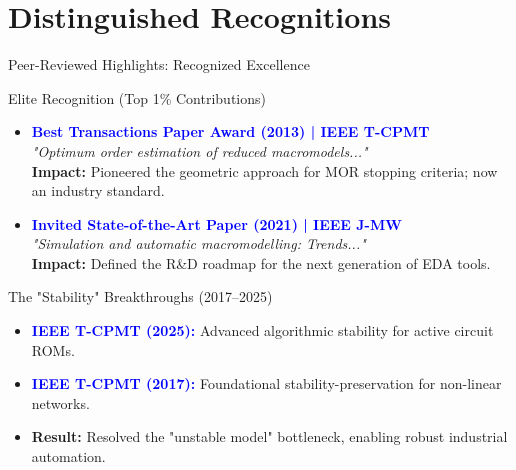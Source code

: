 \section{Distinguished Recognitions}

\begin{frame}[t]{Peer-Reviewed Highlights: Recognized Excellence}

	\begin{exampleblock}{\large Elite Recognition (Top 1\% Contributions)}
		\begin{itemize}
			\item \textbf{\textcolor{blue}{Best Transactions Paper Award (2013) | IEEE T-CPMT}} \\[4pt]
			      \textit{"Optimum order estimation of reduced macromodels..."} \\
			      \textbf{Impact:} Pioneered the geometric approach for MOR stopping criteria; now an industry standard.

			\item \textbf{\textcolor{blue}{\large Invited State-of-the-Art Paper (2021) | IEEE J-MW}} \\
			      \textit{"Simulation and automatic macromodelling: Trends..."} \\
			      \textbf{Impact:} Defined the R\&D roadmap for the next generation of EDA tools.
		\end{itemize}
	\end{exampleblock}

	\vspace{0.2cm}

	\begin{exampleblock}{\large The "Stability" Breakthroughs (2017--2025)}
		\begin{itemize}
			\item \textbf{\textcolor{blue}{IEEE T-CPMT (2025):}} Advanced algorithmic stability for active circuit ROMs.
			\item \textbf{\textcolor{blue}{IEEE T-CPMT (2017):}} Foundational stability-preservation for non-linear networks.
			\item \textbf{Result:} Resolved the "unstable model" bottleneck, enabling robust industrial automation.
		\end{itemize}
	\end{exampleblock}
	\vfill

\end{frame}
